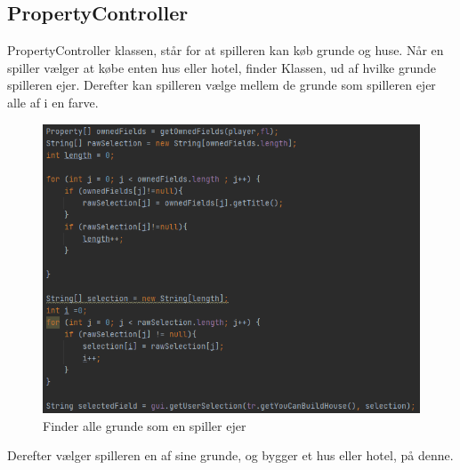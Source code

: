 \subsection{PropertyController}
PropertyController klassen, står for at spilleren kan køb grunde og huse. Når en spiller vælger at købe enten hus eller hotel, finder Klassen, ud af hvilke grunde spilleren ejer. Derefter kan spilleren vælge mellem de grunde som spilleren ejer alle af i en farve. 

\begin{figure}[H]
    \centering
    \includegraphics[width=\textwidth]{sources/7_implementering/propselect.PNG}
    \caption{Finder alle grunde som en spiller ejer}
    \label{fig:SelectField}
\end{figure}

Derefter vælger spilleren en af sine grunde, og bygger et hus eller hotel, på denne.